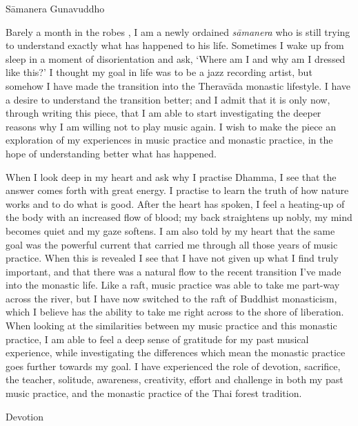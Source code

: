 
Sāmanera Gunavuddho

Barely a month in the robes , I am a newly ordained \emph{sāmanera} who
is still trying to understand exactly what has happened to his life.
Sometimes I wake up from sleep in a moment of disorientation and ask,
`Where am I and why am I dressed like this?' I thought my goal in life
was to be a jazz recording artist, but somehow I have made the
transition into the Theravāda‎ monastic lifestyle. I have a desire to
understand the transition better; and I admit that it is only now,
through writing this piece, that I am able to start investigating the
deeper reasons why I am willing not to play music again. I wish to make
the piece an exploration of my experiences in music practice and
monastic practice, in the hope of understanding better what has
happened.

When I look deep in my heart and ask why I practise Dhamma, I see that
the answer comes forth with great energy. I practise to learn the truth
of how nature works and to do what is good. After the heart has spoken,
I feel a heating-up of the body with an increased flow of blood; my back
straightens up nobly, my mind becomes quiet and my gaze softens. I am
also told by my heart that the same goal was the powerful current that
carried me through all those years of music practice. When this is
revealed I see that I have not given up what I find truly important, and
that there was a natural flow to the recent transition I've made into
the monastic life. Like a raft, music practice was able to take me
part-way across the river, but I have now switched to the raft of
Buddhist monasticism, which I believe has the ability to take me right
across to the shore of liberation. When looking at the similarities
between my music practice and this monastic practice, I am able to feel
a deep sense of gratitude for my past musical experience, while
investigating the differences which mean the monastic practice goes
further towards my goal. I have experienced the role of devotion,
sacrifice, the teacher, solitude, awareness, creativity, effort and
challenge in both my past music practice, and the monastic practice of
the Thai forest tradition.

Devotion

